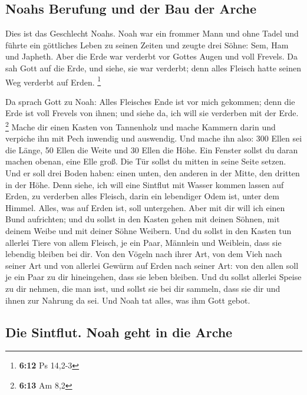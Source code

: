 \hypertarget{noahs-berufung-und-der-bau-der-arche}{%
\subsection{Noahs Berufung und der Bau der
Arche}\label{noahs-berufung-und-der-bau-der-arche}}

 Dies ist das Geschlecht Noahs. Noah war ein frommer Mann
und ohne Tadel und führte ein göttliches Leben zu seinen Zeiten
 und zeugte drei Söhne: Sem, Ham und Japheth.
 Aber die Erde war verderbt vor Gottes Augen und voll
Frevels.  Da sah Gott auf die Erde, und siehe, sie war
verderbt; denn alles Fleisch hatte seinen Weg verderbt auf Erden.
\footnote{\textbf{6:12} Ps 14,2-3}

 Da sprach Gott zu Noah: Alles Fleisches Ende ist vor
mich gekommen; denn die Erde ist voll Frevels von ihnen; und siehe da,
ich will sie verderben mit der Erde. \footnote{\textbf{6:13} Am 8,2}
 Mache dir einen Kasten von Tannenholz und mache Kammern
darin und verpiche ihn mit Pech inwendig und auswendig. 
Und mache ihn also: 300 Ellen sei die Länge, 50 Ellen die Weite und 30
Ellen die Höhe.  Ein Fenster sollst du daran machen
obenan, eine Elle groß. Die Tür sollst du mitten in seine Seite setzen.
Und er soll drei Boden haben: einen unten, den anderen in der Mitte, den
dritten in der Höhe.  Denn siehe, ich will eine Sintflut
mit Wasser kommen lassen auf Erden, zu verderben alles Fleisch, darin
ein lebendiger Odem ist, unter dem Himmel. Alles, was auf Erden ist,
soll untergehen.  Aber mit dir will ich einen Bund
aufrichten; und du sollst in den Kasten gehen mit deinen Söhnen, mit
deinem Weibe und mit deiner Söhne Weibern.  Und du sollst
in den Kasten tun allerlei Tiere von allem Fleisch, je ein Paar,
Männlein und Weiblein, dass sie lebendig bleiben bei dir.
 Von den Vögeln nach ihrer Art, von dem Vieh nach seiner
Art und von allerlei Gewürm auf Erden nach seiner Art: von den allen
soll je ein Paar zu dir hineingehen, dass sie leben bleiben.
 Und du sollst allerlei Speise zu dir nehmen, die man
isst, und sollst sie bei dir sammeln, dass sie dir und ihnen zur Nahrung
da sei.  Und Noah tat alles, was ihm Gott gebot.

\hypertarget{die-sintflut.-noah-geht-in-die-arche}{%
\subsection{Die Sintflut. Noah geht in die
Arche}\label{die-sintflut.-noah-geht-in-die-arche}}

